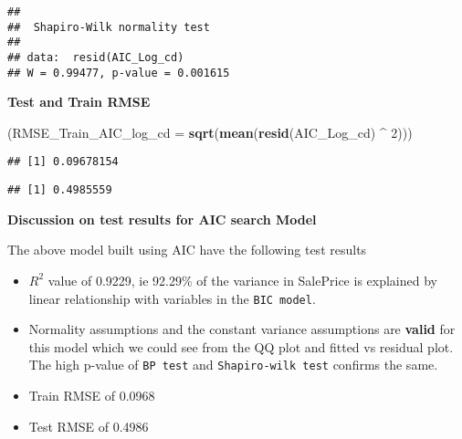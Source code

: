 \documentclass[]{article}
\newenvironment{Shaded}{\begin{snugshade}}{\end{snugshade}}
\newcommand{\KeywordTok}[1]{\textcolor[rgb]{0.13,0.29,0.53}{\textbf{#1}}}
\newcommand{\DataTypeTok}[1]{\textcolor[rgb]{0.13,0.29,0.53}{#1}}
\newcommand{\DecValTok}[1]{\textcolor[rgb]{0.00,0.00,0.81}{#1}}
\newcommand{\StringTok}[1]{\textcolor[rgb]{0.31,0.60,0.02}{#1}}
\newcommand{\OperatorTok}[1]{\textcolor[rgb]{0.81,0.36,0.00}{\textbf{#1}}}
\newcommand{\NormalTok}[1]{#1}
\begin{document}
\begin{verbatim}
## 
##  Shapiro-Wilk normality test
## 
## data:  resid(AIC_Log_cd)
## W = 0.99477, p-value = 0.001615
\end{verbatim}

\textbf{Test and Train RMSE}

\begin{Shaded}
\begin{Highlighting}[]
\NormalTok{(}\DataTypeTok{RMSE_Train_AIC_log_cd =} \KeywordTok{sqrt}\NormalTok{(}\KeywordTok{mean}\NormalTok{(}\KeywordTok{resid}\NormalTok{(AIC_Log_cd) }\OperatorTok{^}\StringTok{ }\DecValTok{2}\NormalTok{)))}
\end{Highlighting}
\end{Shaded}

\begin{verbatim}
## [1] 0.09678154
\end{verbatim}

\begin{Shaded}
\end{Shaded}

\begin{verbatim}
## [1] 0.4985559
\end{verbatim}

\textbf{Discussion on test results for AIC search Model}

The above model built using AIC have the following test results

\begin{itemize}
\item
  \(R^2\) value of 0.9229, ie 92.29\% of the variance in SalePrice is
  explained by linear relationship with variables in the
  \texttt{BIC\ model}.
\item
  Normality assumptions and the constant variance assumptions are
  \textbf{valid} for this model which we could see from the QQ plot and
  fitted vs residual plot. The high p-value of \texttt{BP\ test} and
  \texttt{Shapiro-wilk\ test} confirms the same.
\item
  Train RMSE of 0.0968
\item
  Test RMSE of 0.4986
\end{itemize}
\end{document}
